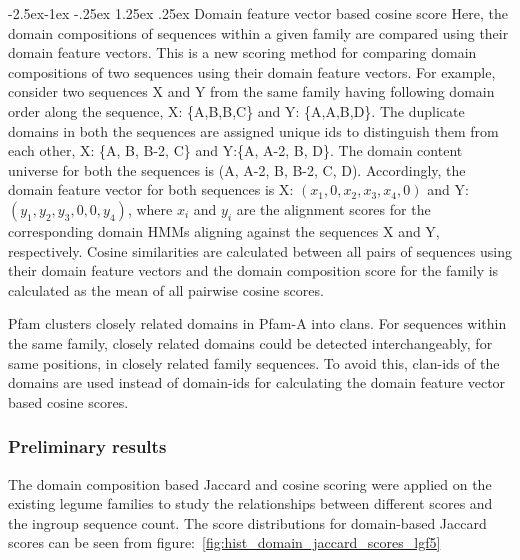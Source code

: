 \documentclass{article}
\makeatletter
\renewcommand\paragraph{\@startsection{paragraph}{4}{\z@}%
	{-2.5ex\@plus -1ex \@minus -.25ex}%
	{1.25ex \@plus .25ex}%
	{\normalfont\normalsize\bfseries}}
\makeatother
\begin{document}
		\paragraph{Domain feature vector based cosine score}
		Here, the domain compositions of sequences within a given family are compared using their domain feature vectors. This is a new scoring method for comparing domain compositions of two sequences using their domain feature vectors. For example, consider two sequences X and Y from the same family having following domain order along the sequence, X: \{A,B,B,C\} and Y: \{A,A,B,D\}. The duplicate domains in both the sequences are assigned unique ids to distinguish them from each other, X: \{A, B, B-2, C\} and Y:\{A, A-2, B, D\}. The domain content universe for both the sequences is (A, A-2, B, B-2, C, D). Accordingly, the domain feature vector for both sequences is X: $(x_{1}, 0, x_{2}, x_{3}, x_{4}, 0)$ and Y: $(y_{1}, y_{2}, y_{3}, 0, 0, y_{4})$, where $x_{i}$ and $y_{i}$ are the alignment scores for the corresponding domain HMMs aligning against the sequences X and Y, respectively. Cosine similarities are calculated between all pairs of sequences using their domain feature vectors and the domain composition score for the family is calculated as the mean of all pairwise cosine scores.
		
		Pfam clusters closely related domains in Pfam-A into clans. For sequences within the same family, closely related domains could be  detected interchangeably, for same positions, in closely related family sequences. To avoid this, clan-ids of the domains are used instead of domain-ids for calculating the domain feature vector based cosine scores.
		
		\subsubsection{Preliminary results}
		The domain composition based Jaccard and cosine scoring were applied on the existing legume families to study the relationships between different scores and the ingroup sequence count. The score distributions for domain-based Jaccard scores can be seen from figure:~\ref{fig:hist_domain_jaccard_scores_lgf5}
		
\end{document}
